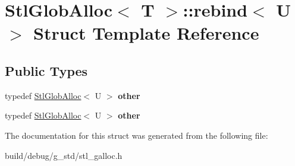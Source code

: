 \hypertarget{structStlGlobAlloc_1_1rebind}{\section{Stl\-Glob\-Alloc$<$ T $>$\-:\-:rebind$<$ U $>$ Struct Template Reference}
\label{structStlGlobAlloc_1_1rebind}
}
\subsection*{Public Types}
\begin{DoxyCompactItemize}
\item 
\hypertarget{structStlGlobAlloc_1_1rebind_ac6c9657f2f8a4868d5a6fcd88c2822a3}{typedef \hyperlink{classStlGlobAlloc}{Stl\-Glob\-Alloc}$<$ U $>$ {\bfseries other}}\label{structStlGlobAlloc_1_1rebind_ac6c9657f2f8a4868d5a6fcd88c2822a3}

\item 
\hypertarget{structStlGlobAlloc_1_1rebind_ac6c9657f2f8a4868d5a6fcd88c2822a3}{typedef \hyperlink{classStlGlobAlloc}{Stl\-Glob\-Alloc}$<$ U $>$ {\bfseries other}}\label{structStlGlobAlloc_1_1rebind_ac6c9657f2f8a4868d5a6fcd88c2822a3}

\end{DoxyCompactItemize}


The documentation for this struct was generated from the following file\-:\begin{DoxyCompactItemize}
\item 
build/debug/g\-\_\-std/stl\-\_\-galloc.\-h\end{DoxyCompactItemize}
